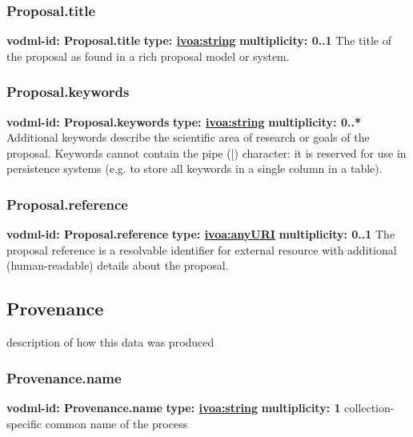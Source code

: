     \subsubsection{Proposal.title}
      \textbf{vodml-id: Proposal.title} \newline
      \textbf{type: \hyperref[sect:ivoa]{ivoa:string}} \newline
      \textbf{multiplicity: 0..1} \newline
      The title of the proposal as found in a rich proposal model or system.

    \subsubsection{Proposal.keywords}
      \textbf{vodml-id: Proposal.keywords} \newline
      \textbf{type: \hyperref[sect:ivoa]{ivoa:string}} \newline
      \textbf{multiplicity: 0..*} \newline
      Additional keywords describe the scientific area of research or goals of the proposal. Keywords cannot contain the pipe (|) character: it is reserved for use in persistence systems (e.g. to store all keywords in a single column in a table).

    \subsubsection{Proposal.reference}
      \textbf{vodml-id: Proposal.reference} \newline
      \textbf{type: \hyperref[sect:ivoa]{ivoa:anyURI}} \newline
      \textbf{multiplicity: 0..1} \newline
      The proposal reference is a resolvable identifier for external resource with additional (human-readable) details about the proposal.

  \subsection{Provenance}
  \label{sect:Provenance}
    description of how this data was produced

    \subsubsection{Provenance.name}
      \textbf{vodml-id: Provenance.name} \newline
      \textbf{type: \hyperref[sect:ivoa]{ivoa:string}} \newline
      \textbf{multiplicity: 1} \newline
      collection-specific common name of the process


